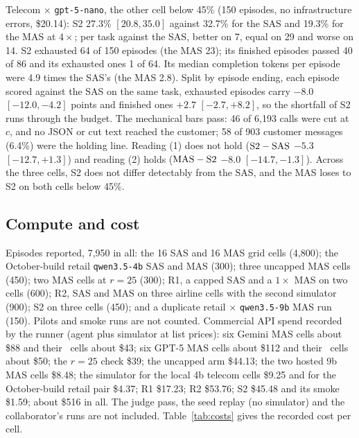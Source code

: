 Telecom $\times$ \texttt{gpt-5-nano}, the other cell below 45\% (150 episodes, no infrastructure errors, \$20.14): S2 27.3\% $[20.8, 35.0]$ against 32.7\% for the SAS and 19.3\% for the MAS at $4\times$; per task against the SAS, better on 7, equal on 29 and worse on 14. S2 exhausted 64 of 150 episodes (the MAS 23); its finished episodes passed 40 of 86 and its exhausted ones 1 of 64. Its median completion tokens per episode were 4.9 times the SAS's (the MAS 2.8). Split by episode ending, each episode scored against the SAS on the same task, exhausted episodes carry $-8.0$ $[-12.0, -4.2]$ points and finished ones $+2.7$ $[-2.7, +8.2]$, so the shortfall of S2 runs through the budget. The mechanical bars pass: 46 of 6,193 calls were cut at $c$, and no JSON or cut text reached the customer; 58 of 903 customer messages (6.4\%) were the holding line. Reading (1) does not hold ($\text{S2}-\text{\textup{SAS}}$ $-5.3$ $[-12.7, +1.3]$) and reading (2) holds ($\text{\textup{MAS}}-\text{S2}$ $-8.0$ $[-14.7, -1.3]$). Across the three cells, S2 does not differ detectably from the SAS, and the MAS loses to S2 on both cells below 45\%.

\subsection{Compute and cost}
\label{sec:compute}
\label{app:compute}

Episodes reported, 7,950 in all: the 16 SAS and 16 MAS grid cells (4,800); the October-build retail \texttt{qwen3.5-4b} SAS and MAS (300); three uncapped MAS cells (450); two MAS cells at $r = 25$ (300); R1, a capped SAS and a $1\times$ MAS on two cells (600); R2, SAS and MAS on three airline cells with the second simulator (900); S2 on three cells (450); and a duplicate retail $\times$ \texttt{qwen3.5-9b} MAS run (150). Pilots and smoke runs are not counted. Commercial API spend recorded by the runner (agent plus simulator at list prices): six Gemini MAS cells about \$88 and their \Sone\ cells about \$43; six GPT-5 MAS cells about \$112 and their \Sone\ cells about \$50; the $r = 25$ check \$39; the uncapped arm \$44.13; the two hosted 9b MAS cells \$8.48; the simulator for the local 4b telecom cells \$9.25 and for the October-build retail pair \$4.37; R1 \$17.23; R2 \$53.76; S2 \$45.48 and its smoke \$1.59; about \$516 in all. The judge pass, the seed replay (no simulator) and the collaborator's runs are not included. Table~\ref{tab:costs} gives the recorded cost per cell.

